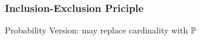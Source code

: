 \subsubsection*{Inclusion-Exclusion Priciple}
Probability Version:
may replace cardinality with $\P$
